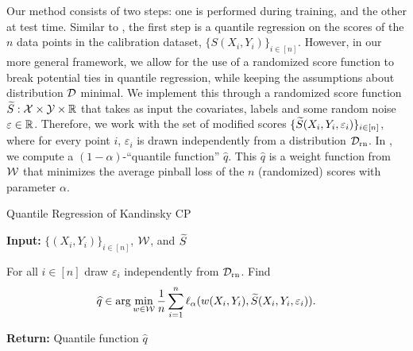 Our method consists of two steps: one is performed during training, and the other at test time. Similar to \citet{JNRR2023}, the first step is a quantile regression on the scores of the $n$ data points in the calibration dataset, $\{S(X_i,Y_i)\}_{i\in [n]}$. However, in our more general framework, we allow for the use of a randomized score function to break potential ties in quantile regression, while keeping the assumptions about distribution ${\cal D}$ minimal. We implement this through a randomized score function ${\widetilde{S}}:{\cal X}\times{\cal Y}\times \mathbb{R}$ that takes as input the covariates, labels and some random noise $\varepsilon \in \mathbb{R}$. Therefore, we work with the set of modified scores $\{{\widetilde{S}}(X_i,Y_i, \varepsilon_i)\}_{i\in [n]}$, where for every point $i$, $\varepsilon_i$ is drawn independently from a distribution ${\cal D}_{\text{rn}}$. In , we compute a $(1-\alpha)$-``quantile function'' $\hat q$. This $\hat q$ is a weight function from ${\cal W}$ that minimizes the average pinball loss of the $n$ (randomized) scores with parameter $\alpha$.
\begin{comment}
That is,
\begin{align}
    \hat{q} \in \arg \min_{w \in \cal W} &\frac{1}{n} \sum_{i=1}^n \ell_\alpha (w(X_i,Y_i), \tS(S(X_i,Y_i), \varepsilon_i)). 
    \label{eq:quantile_reg}
\end{align}
\end{comment}
\begin{algorithm}
\caption{Quantile Regression of Kandinsky CP}
\label{alg:quantile_reg}
\textbf{Input:} $\{(X_i,Y_i)\}_{i \in [n]}$, ${\cal W}$, and ${\widetilde{S}}$
\begin{algorithmic}[1]
    
    \STATE For all $i \in [n]$ draw $\varepsilon_i$ independently from ${\cal D}_{\text{rn}}$.
    \STATE Find
    $$\widehat{q} \in \arg \min_{w \in \cal W} \frac{1}{n} \sum_{i=1}^n \ell_\alpha (w(X_i,Y_i), {\widetilde{S}}(X_i,Y_i, \varepsilon_i)).$$
\end{algorithmic}
 \textbf{Return:} Quantile function $\hat q$
\end{algorithm}

